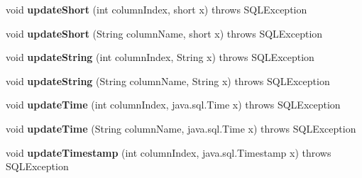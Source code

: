 \begin{DoxyCompactItemize}
void {\bfseries update\+Short} (int column\+Index, short x)  throws S\+Q\+L\+Exception 
\item 
\mbox{\label{classcom_1_1mysql_1_1cj_1_1jdbc_1_1result_1_1_updatable_result_set_ae6723add8ad3b857b6ca770519b431e2}} 
void {\bfseries update\+Short} (String column\+Name, short x)  throws S\+Q\+L\+Exception 
\item 
\mbox{\label{classcom_1_1mysql_1_1cj_1_1jdbc_1_1result_1_1_updatable_result_set_ae92687b0a474c336de90d90a9b110727}} 
void {\bfseries update\+String} (int column\+Index, String x)  throws S\+Q\+L\+Exception 
\item 
\mbox{\label{classcom_1_1mysql_1_1cj_1_1jdbc_1_1result_1_1_updatable_result_set_a521010fdfe7806340f1ecb9b78bf920f}} 
void {\bfseries update\+String} (String column\+Name, String x)  throws S\+Q\+L\+Exception 
\item 
\mbox{\label{classcom_1_1mysql_1_1cj_1_1jdbc_1_1result_1_1_updatable_result_set_ab3b8d2e10ec8801e792b49f9c8a81e03}} 
void {\bfseries update\+Time} (int column\+Index, java.\+sql.\+Time x)  throws S\+Q\+L\+Exception 
\item 
\mbox{\label{classcom_1_1mysql_1_1cj_1_1jdbc_1_1result_1_1_updatable_result_set_a893725edd6953c0a7dfb64b97acd4a63}} 
void {\bfseries update\+Time} (String column\+Name, java.\+sql.\+Time x)  throws S\+Q\+L\+Exception 
\item 
\mbox{\label{classcom_1_1mysql_1_1cj_1_1jdbc_1_1result_1_1_updatable_result_set_a0c7ee79e1a628e8582f9a66e5b130c04}} 
void {\bfseries update\+Timestamp} (int column\+Index, java.\+sql.\+Timestamp x)  throws S\+Q\+L\+Exception 
\item 
\mbox{\label{classcom_1_1mysql_1_1cj_1_1jdbc_1_1result_1_1_updatable_result_set_a5ff5b19436b084f5ea9baf7e74209d21}} 

\end{DoxyCompactItemize}
